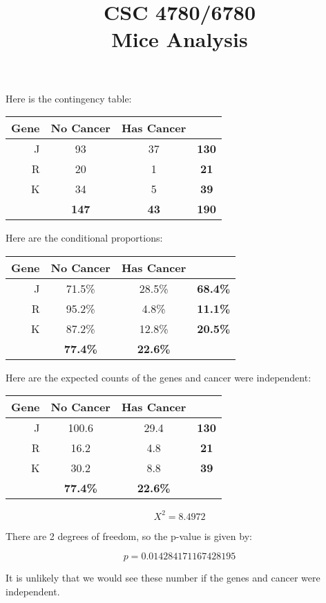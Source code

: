 \documentclass[11pt,english]{article}
\begin{document}
\title{CSC 4780/6780 \\
Mice Analysis}
\maketitle

Here is the contingency table:

\begin{tabular}{ r |  c  c | c }
 Gene & No Cancer & Has Cancer & \\
\hline
J & 93 & 37 & \textbf{130} \\
R & 20 & 1 & \textbf{21} \\
K & 34 & 5 & \textbf{39} \\
\hline
 & \textbf{147} & \textbf{43} & \textbf{190}
\end{tabular}


Here are the conditional proportions:

\begin{tabular}{ r |  c  c | c }
 Gene & No Cancer & Has Cancer & \\
\hline
J & 71.5\% & 28.5\% & \textbf{68.4\%} \\
R & 95.2\% & 4.8\% & \textbf{11.1\%} \\
K & 87.2\% & 12.8\% & \textbf{20.5\%} \\
\hline
 & \textbf{77.4\%} & \textbf{22.6\%} & \textbf{}
\end{tabular}



Here are the expected counts of the genes and cancer were independent:

\begin{tabular}{ r |  c  c | c }
 Gene & No Cancer & Has Cancer & \\
\hline
J & 100.6 & 29.4 & \textbf{130} \\
R & 16.2 & 4.8 & \textbf{21} \\
K & 30.2 & 8.8 & \textbf{39} \\
\hline
 & \textbf{77.4\%} & \textbf{22.6\%} & \textbf{}
\end{tabular}

$$X^2 =  8.4972$$

There are 2 degrees of freedom, so the p-value is given by:

$$p = 0.014284171167428195$$

It is unlikely that we would see these number if the genes and cancer were independent.
\end{document}
